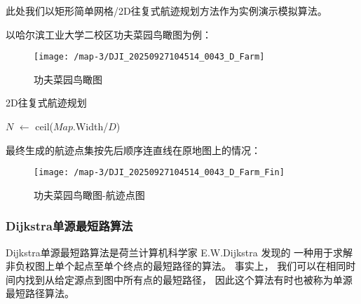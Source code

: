 \documentclass[oneside,UTF8]{ctexart}
\numberwithin{figure}{section} %
\begin{document}
此处我们以矩形简单网格/2D往复式航迹规划方法作为实例演示模拟算法。

以哈尔滨工业大学二校区功夫菜园鸟瞰图为例：

\begin{figure}[H]
  \centering
  \texttt{[image: /map-3/DJI\_20250927104514\_0043\_D\_Farm]}
  \caption{功夫菜园鸟瞰图}
  \label{fig:map-3-farm}
\end{figure}

\begin{algorithm}[H]
  \caption{2D往复式航迹规划}\label{traditional-simulation}

  $N$ $\leftarrow$ ceil($Map$.Width/$D$)\;
\end{algorithm}

最终生成的航迹点集按先后顺序连直线在原地图上的情况：

\begin{figure}[H]
  \centering
  \texttt{[image: /map-3/DJI\_20250927104514\_0043\_D\_Farm\_Fin]}
  \caption{功夫菜园鸟瞰图-航迹点图}
  \label{fig:map-3-farm-fin}
\end{figure}

\subsubsection{Dijkstra单源最短路算法}
Dijkstra单源最短路算法是荷兰计算机科学家 E.W.Dijkstra 发现的
一种用于求解非负权图上单个起点至单个终点的最短路径的算法。
事实上，
我们可以在相同时间内找到从给定源点到图中所有点的最短路径，
因此这个算法有时也被称为单源最短路径算法\textsuperscript{\cite{ref4}}。
\end{document}
